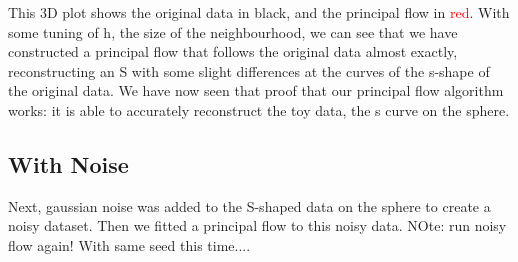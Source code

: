 \documentclass[12pt]{report}
\begin{document}
This 3D plot shows the original data in black, and the principal flow in 
\textcolor{red}{red}.
With some tuning of h, the size of the neighbourhood, we can see that we have constructed
a principal flow that follows the original data almost
exactly, reconstructing an S with some slight differences at the curves of the s-shape of
the original data.
We have now seen that proof that our principal flow algorithm works:
it is able to accurately reconstruct the toy data, 
the s curve on the sphere.

\subsection{With Noise}

Next, gaussian noise was added to the S-shaped data on the sphere to create a noisy dataset.
Then we fitted a principal flow to this noisy data.
NOte: run noisy flow again! With same seed this time....
\end{document}
